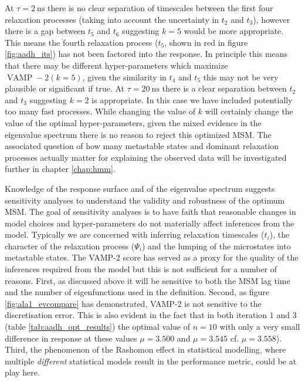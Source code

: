 At $\tau = \SI{2}{\nano\second}$ there is no clear separation of timescales between the first four relaxation processes (taking into account the uncertainty in $t_{2}$ and $t_{3}$), however there is a gap between $t_{5}$ and $t_{6}$ suggesting $k=5$ would be more appropriate. This means the fourth relaxation process ($t_{5}$, shown in red in figure \ref{fig:aadh_its}) has not been factored into the response. In principle this means that there may be different hyper-parameters which maximize $\operatorname{VAMP}-2(k=5)$,  given the similarity in $t_{4}$ and $t_{5}$ this may not be very plausible or significant if true. At $\tau = \SI{20}{\nano\second}$ there is a clear separation between $t_{2}$ and $t_{3}$ suggesting $k=2$ is appropriate. In this case we have included potentially too many fast processes. While changing the value of $k$ will certainly change the value of the optimal hyper-parameters, given the mixed evidence in the eigenvalue spectrum there is no reason to reject this optimized MSM. The associated question of how many metastable states and dominant relaxation processes actually matter for explaining the observed data will be investigated further in chapter \ref{chap:hmm}. 

Knowledge of the response surface and of the eigenvalue spectrum suggests sensitivity analyses to understand the validity and robustness of the optimum MSM.  The goal of sensitivity analyses is to have faith that reasonable changes in model choices and hyper-parameters do not materially affect inferences from the model. Typically we are concerned with inferring relaxation timescales ($t_{i}$), the character of the relaxation process ($\Psi_{i}$) and the lumping of the microstates into metastable states. The VAMP-2 score has served as a proxy for the quality of the inferences required from the model but this is not sufficient  for a number of reasons.  First, as discussed above it will be sensitive to both the MSM lag time and the number of eigenfunctions used in the definition. Second, as figure \ref{fig:ala1_evcompare} has demonstrated, VAMP-2 is not sensitive to the discretisation error. This is also evident in the fact that in both iteration $1$ and $3$ (table \ref{tab:aadh_opt_results}) the optimal value of $n=10$ with only a very small difference in response at these values $\mu = 3.500$ and   $\mu=3.545$ cf. $\mu=3.558$). Third, the phenomenon of the Rashomon effect \cite{breiman2001} in statistical modelling, where  multiple \emph{different} statistical models result in the performance metric, could be at play here.

